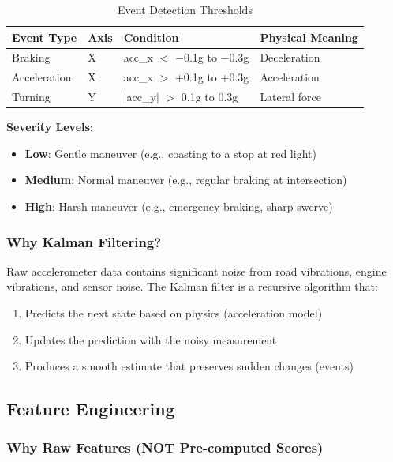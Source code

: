 \documentclass[11pt,a4paper]{article}
\begin{document}
\begin{table}[H]
\centering
\caption{Event Detection Thresholds}
\begin{tabular}{p{2.5cm}p{1.5cm}p{4cm}p{4.5cm}}
\toprule
\textbf{Event Type} & \textbf{Axis} & \textbf{Condition} & \textbf{Physical Meaning} \\
\midrule
Braking & X & acc\_x $<$ $-$0.1g to $-$0.3g & Deceleration \\
Acceleration & X & acc\_x $>$ +0.1g to +0.3g & Acceleration \\
Turning & Y & $|$acc\_y$|$ $>$ 0.1g to 0.3g & Lateral force \\
\bottomrule
\end{tabular}
\end{table}

\textbf{Severity Levels}:
\begin{itemize}[leftmargin=*]
    \item \textbf{Low}: Gentle maneuver (e.g., coasting to a stop at red light)
    \item \textbf{Medium}: Normal maneuver (e.g., regular braking at intersection)
    \item \textbf{High}: Harsh maneuver (e.g., emergency braking, sharp swerve)
\end{itemize}

\subsubsection{Why Kalman Filtering?}

Raw accelerometer data contains significant noise from road vibrations, engine vibrations, and sensor noise. The Kalman filter is a recursive algorithm that:
\begin{enumerate}[leftmargin=*]
    \item Predicts the next state based on physics (acceleration model)
    \item Updates the prediction with the noisy measurement
    \item Produces a smooth estimate that preserves sudden changes (events)
\end{enumerate}

\subsection{Feature Engineering}

\subsubsection{Why Raw Features (NOT Pre-computed Scores)}
\end{document}
